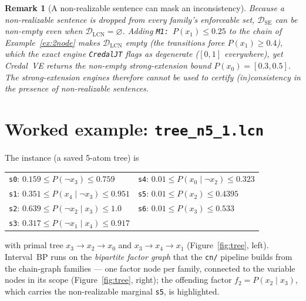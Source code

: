 \documentclass[11pt]{article}
\newtheorem{remark}{Remark}
\newcommand{\DSE}{\mathcal{D}_{\mathrm{SE}}}
\newcommand{\DLCN}{\mathcal{D}_{\mathrm{LCN}}}
\begin{document}
\begin{remark}[A non-realizable sentence can mask an inconsistency]\label{rem:mask}
Because a non-realizable sentence is dropped from every family's enforceable set, $\DSE$ can be
non-empty even when $\DLCN=\varnothing$. Adding \texttt{M1: $P(x_1)\le0.25$} to the chain of
Example~\ref{ex:2node} makes $\DLCN$ empty (the transitions force $P(x_1)\ge0.4$), which the exact
engine \texttt{CredalJT} flags as degenerate ($[0,1]$ everywhere), yet Credal~VE returns the
non-empty strong-extension bound $P(x_0)=[0.3,0.5]$. The strong-extension engines therefore cannot be
used to certify (in)consistency in the presence of non-realizable sentences.
\end{remark}

\section{Worked example: \texttt{tree\_n5\_1.lcn}}\label{sec:tree}

The instance (a saved 5-atom tree) is
\begin{center}\small
\begin{tabular}{ll}
\texttt{s0}: $0.159\le P(\lnot x_3)\le0.759$ & \texttt{s4}: $0.01\le P(x_0\mid\lnot x_2)\le0.323$\\
\texttt{s1}: $0.351\le P(x_4\mid\lnot x_3)\le0.951$ & \texttt{s5}: $0.01\le P(x_2)\le0.4395$\\
\texttt{s2}: $0.639\le P(\lnot x_2\mid x_3)\le1.0$ & \texttt{s6}: $0.01\le P(x_3)\le0.533$\\
\texttt{s3}: $0.317\le P(\lnot x_1\mid x_4)\le0.917$ &
\end{tabular}
\end{center}
with primal tree $x_3\!\to\!x_2\!\to\!x_0$ and $x_3\!\to\!x_4\!\to\!x_1$ (Figure~\ref{fig:tree},
left). Interval~BP runs on the \emph{bipartite factor graph} that the \texttt{cn/} pipeline builds
from the chain-graph families --- one factor node per family, connected to the variable nodes in its
scope (Figure~\ref{fig:tree}, right); the offending factor $f_2=P(x_2\mid x_3)$, which carries the
non-realizable marginal \texttt{s5}, is highlighted.
\end{document}

